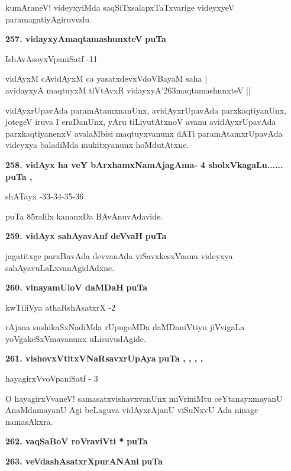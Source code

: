 \smallskip
kumAraneV! videyxyiMda saqSiTxsalapxTaTxvarige videyxyeV paramagatiyAgiruvudu.

\medskip
\noindent
\textbf{257. vidayxyAmaqtamashunxteV} \hfill{\bf puTa \pageref{86}}

\hfill{IshAvAsoyxVpaniSatf -11}

\begin{shloka}
vidAyxM cAvidAyxM ca yasatxdevxVdoVBayaM saha |\\
avidayxyA maqtuyxM tiVtAvxR vidayxyA\char'263maqtamashunxteV ||
\end{shloka}

\smallskip
vidAyxrUpavAda paramAtamxnanUnx, avidAyxrUpavAda parxkaqtiyanUnx, jotegeV iruva I era\-Da\-nUnx, yAru tiLiyutAtxnoV avanu avidAyxrUpavAda parxkaqti\-yanenxV avalaMbisi maqtuyxvanunx dATi para\-mAtamx\-rUpavAda videyxya baladiMda mukitxyanunx hoMdutAtxne.

\medskip
\noindent
\textbf{258. vidAyx ha veY bArxhamxNamAjagAma- 4 sholxVkagaLu......} \hfill{\bf puTa \pageref{48}, \pageref{85}}

\hfill{shATayx -33-34-35-36}

\smallskip
puTa 85ralilx kananxDa BAvAnuvAdavide.

\medskip
\noindent
\textbf{259. vidAyx sahAyavAnf deVvaH} \hfill{\bf puTa \pageref{86}}

\smallskip
jagatitxge parxBuvAda devvanAda viSavxkesxVnanu videyxya sahAyavuLaLxvanAgidAdxne.

\medskip
\noindent
\textbf{260. vinayamUloV daMDaH} \hfill{\bf puTa \pageref{93}}

\hfill{kwTiliVya athaRshAsatxrX -2}

\smallskip
rAjana sushikaSxNadiMda rUpugoMDa daMDaniVtiyu jiVvigaLa yoVgakeSxVma\-vanunx uLisuvudAgide.

\medskip
\noindent
\textbf{261. vishovxVtitxVNaRsavxrUpAya} \hfill{\bf puTa \pageref{19}, \pageref{65}, \pageref{69}, \pageref{102}, \pageref{128}}

\hfill{hayagirxVvoVpaniSatf - 3}

\smallskip
O hayagirxVvaneV! samasatxvishavxvanUnx miVriniMtu ceYtanayxmayanU AnaMda\-mayanU Agi beLaguva vidAyxrAjanU viSuNxvU Ada ninage namasAkxra.

\medskip
\noindent
\textbf{262. vaqSaBoV roVraviVti *} \hfill{\bf puTa \pageref{117}}

\eject

\noindent
\textbf{263. veVdashAsatxrXpurANAni} \hfill{\bf puTa \pageref{42}}

